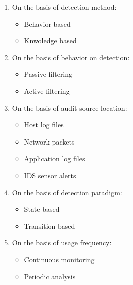 \begin{enumerate}
    \item On the basis of detection method:
        \begin{itemize}
            \item Behavior based
            \item Knwoledge based
        \end{itemize}
    \item On the basis of behavior on detection:
        \begin{itemize}
            \item Passive filtering
            \item Active filtering
        \end{itemize}
    \item On the basis of audit source location:
        \begin{itemize}
            \item Host log files
            \item Network packets
            \item Application log files
            \item IDS sensor alerts
        \end{itemize}
    \item On the basis of detection paradigm:
        \begin{itemize}
            \item State based
            \item Transition based
        \end{itemize}
    \item On the basis of usage frequency:
        \begin{itemize}
            \item Continuous monitoring
            \item Periodic analysis
        \end{itemize}
\end{enumerate}
